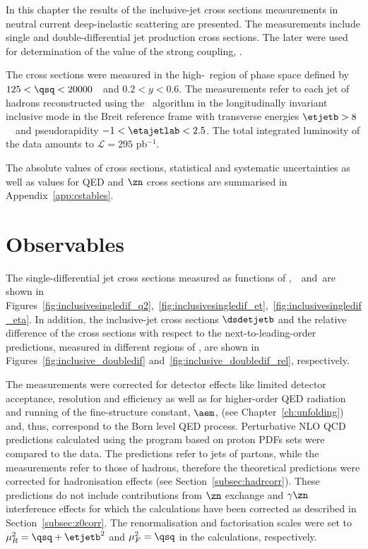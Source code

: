 In this chapter the results of the inclusive-jet cross sections measurements in neutral current deep-inelastic scattering are presented. The measurements include single and double-differential jet production cross sections. The later were used for determination of the value of the strong coupling, \asz. 

The cross sections were measured in the high-\qsq~region of phase space defined by $125 < \qsq < 20000$~\GeV~and $0.2<y<0.6$. The measurements refer to each jet of hadrons reconstructed using the \kt\, algorithm in the longitudinally invariant inclusive mode in the Breit reference frame with transverse energies $\etjetb > 8$~\GeV~and pseudorapidity $-1<\etajetlab<2.5$. The total integrated luminosity of the data amounts to $\mathcal{L}=295$ pb$^{-1}$.

The absolute values of cross sections, statistical and systematic uncertainties as well as values for QED and $\zn$ cross sections are summarised in Appendix~\ref{app:cstables}.

\section{Observables}
The single-differential jet cross sections measured as functions of \qsq,~\etjetb~and~\etajetlab are shown in Figures~\ref{fig:inclusivesingledif_q2},~\ref{fig:inclusivesingledif_et},~\ref{fig:inclusivesingledif_eta}. In addition, the inclusive-jet cross sections $\dsdetjetb$ and the relative difference of the cross sections with respect to the next-to-leading-order predictions, measured in different regions of \qsq, are shown in Figures~\ref{fig:inclusive_doubledif} and~\ref{fig:inclusive_doubledif_rel}, respectively.

The measurements were corrected for detector effects like limited detector acceptance, resolution and efficiency as well as for higher-order QED radiation and running of the fine-structure constant, $\aem$, (see Chapter~\ref{ch:unfolding}) and, thus, correspond to the Born level QED process. Perturbative NLO QCD predictions calculated using the \nlojet program based on  proton PDFs sets were compared to the data. The \nlojet predictions refer to jets of partons, while the measurements refer to those of hadrons, therefore the theoretical predictions were corrected for hadronisation effects (see Section~\ref{subsec:hadrcorr}). These predictions do not include contributions from $\zn$ exchange and $\gamma\zn$ interference effects for which the calculations have been corrected as described in Section~\ref{subsec:z0corr}. The renormalisation and factorisation scales were set to $\mu_R^2 = \qsq + \etjetb^2$ and $\mu_F^2 = \qsq$ in the calculations, respectively.

